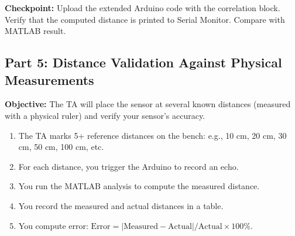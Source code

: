 \documentclass[11pt,letterpaper]{article}
\providecommand{\cpECE}[1]{\textcolor{OliveGreen}{\textbf{Checkpoint:} #1}}
\begin{document}
\cpECE{Upload the extended Arduino code with the correlation block. Verify that the computed distance is printed to Serial Monitor. Compare with MATLAB result.}

\subsection{Part 5: Distance Validation Against Physical Measurements}

\textbf{Objective:} The TA will place the sensor at several known distances (measured with a physical ruler) and verify your sensor's accuracy.

\begin{enumerate}
    \item The TA marks 5+ reference distances on the bench: e.g., 10 cm, 20 cm, 30 cm, 50 cm, 100 cm, etc.
    \item For each distance, you trigger the Arduino to record an echo.
    \item You run the MATLAB analysis to compute the measured distance.
    \item You record the measured and actual distances in a table.
    \item You compute error: $\text{Error} = |\text{Measured} - \text{Actual}| / \text{Actual} \times 100\%$.
\end{enumerate}
\end{document}
